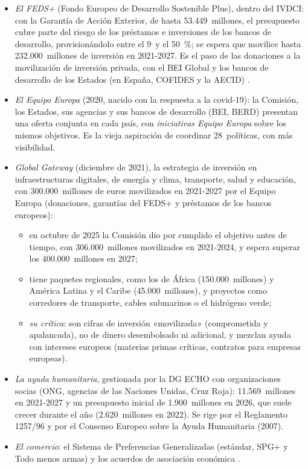\documentclass[11pt]{article}
\begin{document}
\begin{itemize}
\item \emph{El FEDS+} (Fondo Europeo de Desarrollo Sostenible Plus), dentro del IVDCI: con la Garantía de Acción Exterior, de hasta 53.449~millones, el presupuesto cubre parte del riesgo de los préstamos e inversiones de los bancos de desarrollo, provisionándolo entre el 9~y el 50~\%; se espera que movilice hasta 232.000~millones de inversión en 2021-2027\nocite{CE2026GlobalGateway}. Es el paso de las donaciones a la movilización de inversión privada, con el BEI Global y los bancos de desarrollo de los Estados (en España, COFIDES y la AECID) .
\item \emph{El Equipo Europa} (2020, nacido con la respuesta a la covid-19): la Comisión, los Estados, sus agencias y sus bancos de desarrollo (BEI, BERD) presentan una oferta conjunta en cada país, con \emph{iniciativas Equipo Europa} sobre los mismos objetivos. Es la vieja aspiración de coordinar 28~políticas, con más visibilidad.
\item \emph{Global Gateway} (diciembre de 2021), la estrategia de inversión en infraestructuras digitales, de energía y clima, transporte, salud y educación, con 300.000~millones de euros movilizados en 2021-2027 por el Equipo Europa (donaciones, garantías del FEDS+ y préstamos de los bancos europeos):
  \begin{itemize}
  \item en octubre de 2025 la Comisión dio por cumplido el objetivo antes de tiempo, con 306.000~millones movilizados en 2021-2024, y espera superar los 400.000~millones en 2027\nocite{CE2025GlobalGatewayForo};
  \item tiene paquetes regionales, como los de África (150.000~millones) y América Latina y el Caribe (45.000~millones), y proyectos como corredores de transporte, cables submarinos o el hidrógeno verde;
  \item \emph{su crítica}: son cifras de inversión «movilizada» (comprometida y apalancada), no de dinero desembolsado ni adicional, y mezclan ayuda con intereses europeos (materias primas críticas, contratos para empresas europeas).
  \end{itemize}
\item \emph{La ayuda humanitaria}, gestionada por la DG ECHO con organizaciones socias (ONG, agencias de las Naciones Unidas, Cruz Roja): 11.569~millones en 2021-2027 y un presupuesto inicial de 1.900~millones en 2026, que suele crecer durante el año (2.620~millones en 2022)\nocite{ECHO2026}. Se rige por el Reglamento 1257/96 y por el Consenso Europeo sobre la Ayuda Humanitaria (2007).
\item \emph{El comercio}: el Sistema de Preferencias Generalizadas (estándar, SPG+ y Todo menos armas) y los acuerdos de asociación económica .
\end{itemize}
\end{document}
